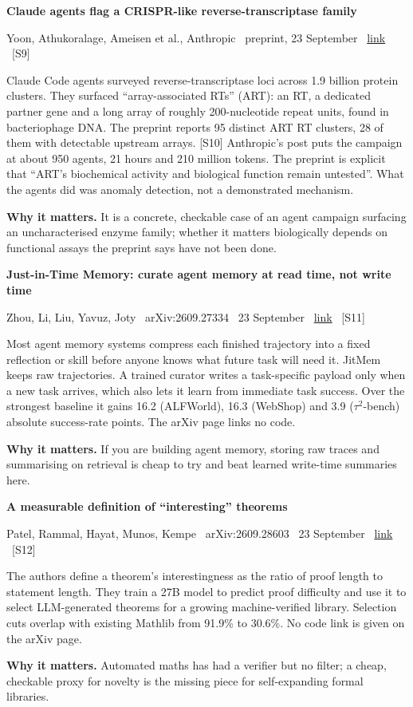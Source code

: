 \documentclass[11pt,a4paper]{article}
\newcommand{\entry}[4]{%
  \par\vspace{0.7em}%
  {\sffamily\bfseries\color{brandink}#1}\par
  {\footnotesize\color{brandgrey}#2 \textbullet\ \href{#3}{link} \textbullet\ \srcref{#4}}\par
  \vspace{0.15em}}
\newcommand{\why}[1]{\par{\small\textbf{Why it matters.} #1}\par}
\newcommand{\srcref}[1]{\textcolor{brandaccent}{[S#1]}}
\begin{document}
\entry{Claude agents flag a CRISPR-like reverse-transcriptase family}{Yoon, Athukoralage, Ameisen et al., Anthropic \textbullet\ preprint, 23 September}{https://www.anthropic.com/news/claude-discovers-novel-enzyme-system}{9}
Claude Code agents surveyed reverse-transcriptase loci across 1.9 billion protein clusters.
They surfaced ``array-associated RTs'' (ART): an RT, a dedicated partner gene and a long
array of roughly 200-nucleotide repeat units, found in bacteriophage DNA. The preprint
reports 95 distinct ART RT clusters, 28 of them with detectable upstream arrays. \srcref{10}
Anthropic's post puts the campaign at about 950 agents, 21 hours and 210 million tokens.
The preprint is explicit that ``ART's biochemical activity and biological function remain
untested''. What the agents did was anomaly detection, not a demonstrated mechanism.
\why{It is a concrete, checkable case of an agent campaign surfacing an uncharacterised enzyme family; whether it matters biologically depends on functional assays the preprint says have not been done.}

\entry{Just-in-Time Memory: curate agent memory at read time, not write time}{Zhou, Li, Liu, Yavuz, Joty \textbullet\ arXiv:2609.27334 \textbullet\ 23 September}{https://arxiv.org/abs/2609.27334}{11}
Most agent memory systems compress each finished trajectory into a fixed reflection or
skill before anyone knows what future task will need it. JitMem keeps raw trajectories.
A trained curator writes a task-specific payload only when a new task arrives, which also
lets it learn from immediate task success. Over the strongest baseline it gains 16.2
(ALFWorld), 16.3 (WebShop) and 3.9 ($\tau^2$-bench) absolute success-rate points. The
arXiv page links no code.
\why{If you are building agent memory, storing raw traces and summarising on retrieval is cheap to try and beat learned write-time summaries here.}

\entry{A measurable definition of ``interesting'' theorems}{Patel, Rammal, Hayat, Munos, Kempe \textbullet\ arXiv:2609.28603 \textbullet\ 23 September}{https://arxiv.org/abs/2609.28603}{12}
The authors define a theorem's interestingness as the ratio of proof length to statement
length. They train a 27B model to predict proof difficulty and use it to select
LLM-generated theorems for a growing machine-verified library. Selection cuts overlap with
existing Mathlib from 91.9\% to 30.6\%. No code link is given on the arXiv page.
\why{Automated maths has had a verifier but no filter; a cheap, checkable proxy for novelty is the missing piece for self-expanding formal libraries.}
\end{document}
